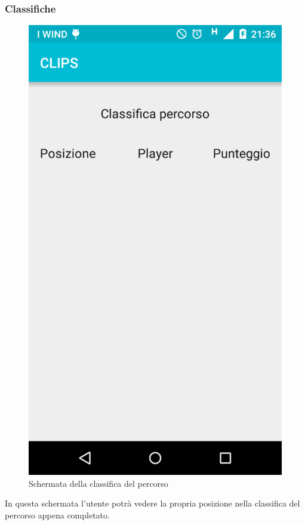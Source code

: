 \subsubsection{Classifiche}

\begin{figure}[!h]
	\centering
	\includegraphics[scale=0.15]{screenshot/classifica}
	\caption{Schermata della classifica del percorso}
\end{figure}

In questa schermata l'utente potrà vedere la propria posizione nella classifica del percorso appena completato.